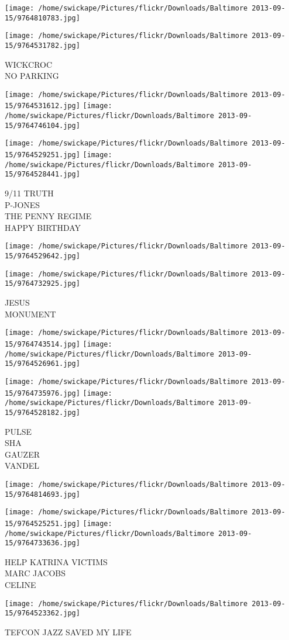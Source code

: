 \documentclass[10pt,letterpaper]{article}
\begin{document}
\texttt{[image: /home/swickape/Pictures/flickr/Downloads/Baltimore 2013-09-15/9764810783.jpg]}

\vspace{0.25in}
\texttt{[image: /home/swickape/Pictures/flickr/Downloads/Baltimore 2013-09-15/9764531782.jpg]}

WICKCROC\\
NO PARKING
\pagebreak

\texttt{[image: /home/swickape/Pictures/flickr/Downloads/Baltimore 2013-09-15/9764531612.jpg]}
\texttt{[image: /home/swickape/Pictures/flickr/Downloads/Baltimore 2013-09-15/9764746104.jpg]}

\texttt{[image: /home/swickape/Pictures/flickr/Downloads/Baltimore 2013-09-15/9764529251.jpg]}
\texttt{[image: /home/swickape/Pictures/flickr/Downloads/Baltimore 2013-09-15/9764528441.jpg]}

9/11 TRUTH\\
P{-}JONES\\
THE PENNY REGIME\\
HAPPY BIRTHDAY
\pagebreak

\texttt{[image: /home/swickape/Pictures/flickr/Downloads/Baltimore 2013-09-15/9764529642.jpg]}

\vspace{0.25in}
\texttt{[image: /home/swickape/Pictures/flickr/Downloads/Baltimore 2013-09-15/9764732925.jpg]}

JESUS\\
MONUMENT
\pagebreak

\texttt{[image: /home/swickape/Pictures/flickr/Downloads/Baltimore 2013-09-15/9764743514.jpg]}
\texttt{[image: /home/swickape/Pictures/flickr/Downloads/Baltimore 2013-09-15/9764526961.jpg]}

\texttt{[image: /home/swickape/Pictures/flickr/Downloads/Baltimore 2013-09-15/9764735976.jpg]}
\texttt{[image: /home/swickape/Pictures/flickr/Downloads/Baltimore 2013-09-15/9764528182.jpg]}

PULSE\\
SHA\\
GAUZER\\
VANDEL
\pagebreak

\texttt{[image: /home/swickape/Pictures/flickr/Downloads/Baltimore 2013-09-15/9764814693.jpg]}

\vspace{0.25in}
\texttt{[image: /home/swickape/Pictures/flickr/Downloads/Baltimore 2013-09-15/9764525251.jpg]}
\texttt{[image: /home/swickape/Pictures/flickr/Downloads/Baltimore 2013-09-15/9764733636.jpg]}

HELP KATRINA VICTIMS\\
MARC JACOBS\\
CELINE
\pagebreak

\texttt{[image: /home/swickape/Pictures/flickr/Downloads/Baltimore 2013-09-15/9764523362.jpg]}

TEFCON JAZZ SAVED MY LIFE
\pagebreak
\end{document}
